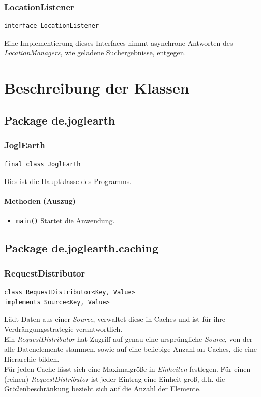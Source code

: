 \documentclass[10pt]{scrreprt}
\begin{document}
\vspace{5mm}
\subsection*{LocationListener}
\begin{lstlisting}
interface LocationListener
\end{lstlisting}
Eine Implementierung dieses Interfaces nimmt asynchrone Antworten des \textit{LocationManagers}, wie geladene Suchergebnisse, entgegen.\\




\chapter{Beschreibung der Klassen}
\section{Package de.joglearth}
\subsection*{JoglEarth}
\begin{lstlisting}
final class JoglEarth
\end{lstlisting}
Dies ist die Hauptklasse des Programms.\\
\subsubsection*{Methoden (Auszug)}
\begin{itemize}\item\texttt{main()} Startet die Anwendung.
\end{itemize}


\vspace{5mm}
\section{Package de.joglearth.caching}
\subsection*{RequestDistributor}
\begin{lstlisting}
class RequestDistributor<Key, Value>
implements Source<Key, Value>
\end{lstlisting}
Lädt Daten aus einer \textit{Source}, verwaltet diese in Caches und ist für ihre Verdrängungsstrategie verantwortlich.\\
Ein \textit{RequestDistributor} hat Zugriff auf genau eine ursprüngliche \textit{Source}, von der alle Datenelemente stammen, sowie auf eine beliebige Anzahl an Caches, die eine Hierarchie bilden.\\
Für jeden Cache lässt sich eine Maximalgröße in \textit{Einheiten} festlegen. Für einen (reinen) \textit{RequestDistributor} ist jeder Eintrag eine Einheit groß, d.h. die Größenbeschränkung bezieht sich auf die Anzahl der Elemente.\\
\end{document}
